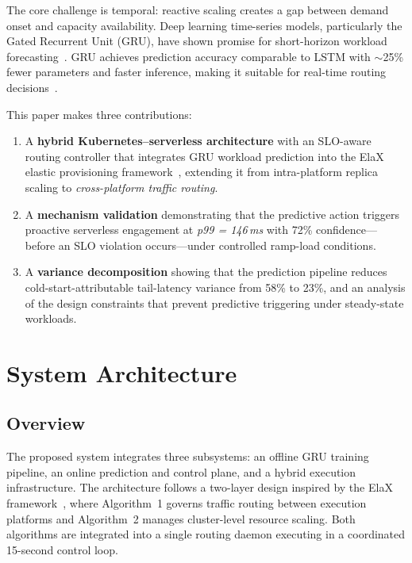 \documentclass[conference,letterpaper]{IEEEtran}
\begin{document}
The core challenge is temporal: reactive scaling creates a gap between demand onset and capacity availability. Deep learning time-series models, particularly the Gated Recurrent Unit (GRU), have shown promise for short-horizon workload forecasting~\cite{mondal2023kubernetes}. GRU achieves prediction accuracy comparable to LSTM with $\sim$25\% fewer parameters and faster inference, making it suitable for real-time routing decisions~\cite{chung2014empirical}.

This paper makes three contributions:
\begin{enumerate}
    \item A \textbf{hybrid Kubernetes--serverless architecture} with an SLO-aware routing controller that integrates GRU workload prediction into the ElaX elastic provisioning framework~\cite{yang2019elax}, extending it from intra-platform replica scaling to \textit{cross-platform traffic routing}.
    \item A \textbf{mechanism validation} demonstrating that the predictive action triggers proactive serverless engagement at \textit{p99 = 146\,ms} with 72\% confidence---before an SLO violation occurs---under controlled ramp-load conditions.
    \item A \textbf{variance decomposition} showing that the prediction pipeline reduces cold-start-attributable tail-latency variance from 58\% to 23\%, and an analysis of the design constraints that prevent predictive triggering under steady-state workloads.
\end{enumerate}

\section{System Architecture}

\subsection{Overview}

The proposed system integrates three subsystems: an offline GRU training pipeline, an online prediction and control plane, and a hybrid execution infrastructure. The architecture follows a two-layer design inspired by the ElaX framework~\cite{yang2019elax}, where Algorithm~1 governs traffic routing between execution platforms and Algorithm~2 manages cluster-level resource scaling. Both algorithms are integrated into a single routing daemon executing in a coordinated 15-second control loop.
\end{document}
